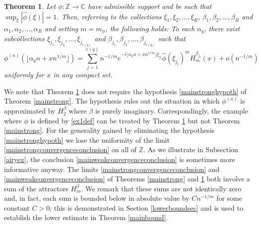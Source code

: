 \documentclass{article}
\theoremstyle{theorem}
\newtheorem{theorem}{Theorem}[section]
\theoremstyle{remark}
\begin{document}
\begin{theorem}\label{mainweak}
Let $\phi:\mathbb{Z}\rightarrow\mathbb{C}$ have admissible support and be such
that $ \sup_\xi|\hat\phi(\xi)|=1$. Then, referring to the collections $\xi_1,\xi_2,\dots,\xi_R$, $\beta_1,\beta_2,\dots,\beta_R$ and $\alpha_1,\alpha_2,\dots,\alpha_R$ and setting $m=m_\phi$, the following holds: To each $\alpha_q$, there exist subcollections $\xi_{j_1},\xi_{j_2},\dots,\xi_{j_{r(q)}}$ and $\beta_{j_1},\beta_{j_2},\dots,\beta_{j_{r(q)}}$ such that
\begin{equation}\label{mainweakconvergenceconclusion}
 \phi^{(n)}(\lfloor\alpha_q n+xn^{1/m}\rfloor)=\sum_{j=1}^{r(q)}n^{-1/m}e^{-i\lfloor\alpha_q n+xn^{1/m}\rfloor\xi_{j_l}}\hat{\phi}(\xi_{j_l})^m H_m^{\beta_{j_l}}(x)+o(n^{-1/m})
\end{equation}
uniformly for $x$ in any compact set.
\end{theorem}

\noindent We note that Theorem \ref{mainweak} does not require the hypothesis \eqref{mainstronghypoth} of Theorem \ref{mainstrong}. The hypothesis rules out the situation in which $\phi^{(n)}$ is approximated by $H_2^{\beta}$ where $\beta$ is purely imaginary. Correspondingly, the example where $\phi$ is defined by \eqref{ex1def} can be treated by Theorem \ref{mainweak} but not Theorem \ref{mainstrong}.  For the generality gained by eliminating the hypothesis \eqref{mainstronghypoth} we lose the uniformity of the limit \eqref{mainstrongconvergenceconclusion} on all of $\mathbb{Z}$. As we illustrate in Subsection \ref{airyex}, the conclusion \eqref{mainweakconvergenceconclusion} is sometimes more informative anyway. The limits \eqref{mainstrongconvergenceconclusion} and \eqref{mainweakconvergenceconclusion} of Theorems \ref{mainstrong} and \ref{mainweak} both involve a sum of the attractors $H_m^{\beta}$. We remark that these sums are not identically zero and, in fact, each sum is bounded below in absolute 
value by $Cn^{-1/m}$ for some constant $C>0$; this is demonstrated in Section \ref{lowerboundsec} and is used to establish the lower estimate in Theorem \ref{mainbound}.\\
\end{document}
